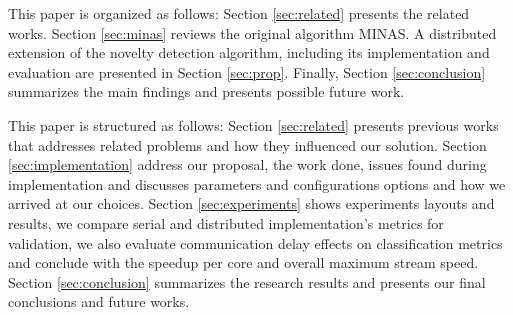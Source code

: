 This paper  is organized as follows:
Section \ref{sec:related} presents the related works.
Section \ref{sec:minas} reviews the original algorithm MINAS.
A distributed extension of the novelty detection algorithm, including its
implementation and evaluation are presented in Section \ref{sec:prop}.
Finally, Section \ref{sec:conclusion} summarizes the main findings and presents
possible future work.








This paper is structured as follows:
Section \ref{sec:related} presents previous works that addresses related
problems and how they influenced our solution.
Section \ref{sec:implementation} address our proposal, the work done, issues
found during implementation and discusses parameters and configurations options
and how we arrived at our choices.
Section \ref{sec:experiments} shows experiments layouts and results, we
compare serial and distributed implementation's metrics for validation,
we also evaluate communication delay effects on classification metrics and
conclude with the speedup per core and overall maximum stream speed.
Section \ref{sec:conclusion} summarizes the research results and presents our
final conclusions and future works.
